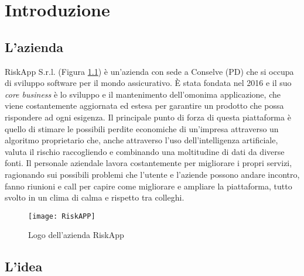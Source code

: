 \chapter{Introduzione}
\label{cap:introduzione}

%
%
%

\section{L'azienda}

RiskApp S.r.l. (Figura \ref{fig:riskapp}) è un'azienda con sede a Conselve (PD) che si occupa di sviluppo software per il mondo assicurativo.\newline
È stata fondata nel 2016 e il suo \textit{core business} è lo sviluppo e il mantenimento dell'omonima applicazione, che viene costantemente aggiornata ed estesa per garantire un prodotto che possa rispondere ad ogni esigenza.\newline
Il principale punto di forza di questa piattaforma è quello di stimare le possibili perdite economiche di un’impresa attraverso un algoritmo proprietario che, anche attraverso l’uso dell'intelligenza artificiale, valuta il rischio raccogliendo e combinando una moltitudine di dati da diverse fonti.\newline
Il personale aziendale lavora costantemente per migliorare i propri servizi, ragionando sui possibili problemi che l'utente e l'aziende possono andare incontro, fanno riunioni e call per capire come migliorare e ampliare la piattaforma, tutto svolto in un clima di calma e rispetto tra colleghi.

\begin{figure}[!h] 
    \centering 
    \texttt{[image: RiskAPP]} 
    \caption{Logo dell'azienda RiskApp}\label{fig:riskapp}
\end{figure}

\newpage

\section{L'idea}

